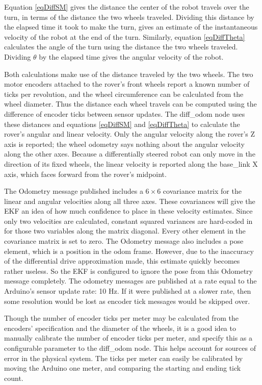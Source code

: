 Equation \ref{eqDiffSM} gives the distance the center of the robot travels over the turn, in terms of the distance the two wheels traveled. Dividing this distance by the elapsed time it took to make the turn, gives an estimate of the instantaneous velocity of the robot at the end of the turn. Similarly, equation \ref{eqDiffTheta} calculates the angle of the turn using the distance the two wheels traveled. Dividing \(\theta\) by the elapsed time gives the angular velocity of the robot.

Both calculations make use of the distance traveled by the two wheels. The two motor encoders attached to the rover's front wheels report a known number of ticks per revolution, and the wheel circumference can be calculated from the wheel diameter. Thus the distance each wheel travels can be computed using the difference of encoder ticks between sensor updates. The diff\_odom node uses these distances and equations \ref{eqDiffSM} and \ref{eqDiffTheta} to calculate the rover's angular and linear velocity. Only the angular velocity along the rover's Z axis is reported; the wheel odometry says nothing about the angular velocity along the other axes. Because a differentially steered robot can only move in the direction of its fixed wheels, the linear velocity is reported along the base\_link X axis, which faces forward from the rover's midpoint.

The Odometry message published includes a \(6 \times 6\) covariance matrix for the linear and angular velocities along all three axes. These covariances will give the EKF an idea of how much confidence to place in these velocity estimates. Since only two velocities are calculated, constant squared variances are hard-coded in for those two variables along the matrix diagonal. Every other element in the covariance matrix is set to zero. The Odometry message also includes a pose element, which is a position in the odom frame. However, due to the inaccuracy of the differential drive approximation made, this estimate quickly becomes rather useless. So the EKF is configured to ignore the pose from this Odometry message completely. The odometry messages are published at a rate equal to the Arduino's sensor update rate: 10 Hz. If it were published at a slower rate, then some resolution would be lost as encoder tick messages would be skipped over.

Though the number of encoder ticks per meter may be calculated from the encoders' specification and the diameter of the wheels, it is a good idea to manually calibrate the number of encoder ticks per meter, and specify this as a configurable parameter to the diff\_odom node. This helps account for sources of error in the physical system. The ticks per meter can easily be calibrated by moving the Arduino one meter, and comparing the starting and ending tick count.

